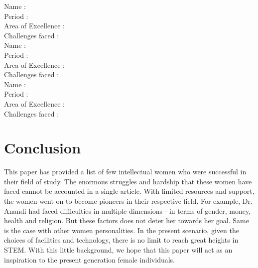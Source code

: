 \documentclass[a4paper,10pt]{article}
\begin{document}
\newblock
Name : \\
Period : \\
Area of Excellence : \\
Challenges faced : \\

\newblock
Name : \\
Period : \\
Area of Excellence : \\
Challenges faced : \\

\newblock
Name : \\
Period : \\
Area of Excellence : \\
Challenges faced : \\

\section{Conclusion}
\label{sec:conclusion}
This paper has provided a list of few intellectual women who were successful in their field of study. The enormous struggles and hardship that these women have faced cannot be accounted in a single article. With limited resources and support, the women went on to become pioneers in their respective field. For example, Dr. Anandi had faced difficulties in multiple dimensions - in terms of gender, money, health and religion. But these factors does not deter her towards her goal. Same is the case with other women personalities. In the present scenario, given the choices of facilities and technology, there is no limit to reach great heights in STEM. With this little background, we hope that this paper will act as an inspiration to the present generation female individuals.
\end{document}
